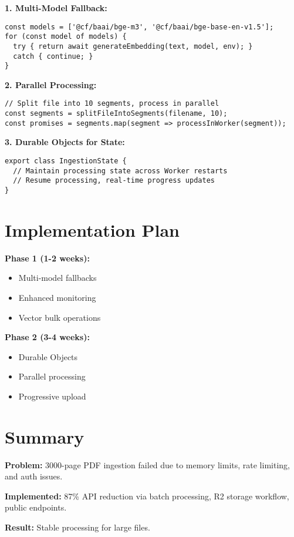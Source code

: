 \documentclass[11pt,a4paper]{article}
\begin{document}
\textbf{1. Multi-Model Fallback:}
\begin{lstlisting}
const models = ['@cf/baai/bge-m3', '@cf/baai/bge-base-en-v1.5'];
for (const model of models) {
  try { return await generateEmbedding(text, model, env); }
  catch { continue; }
}
\end{lstlisting}

\textbf{2. Parallel Processing:}
\begin{lstlisting}
// Split file into 10 segments, process in parallel
const segments = splitFileIntoSegments(filename, 10);
const promises = segments.map(segment => processInWorker(segment));
\end{lstlisting}

\textbf{3. Durable Objects for State:}
\begin{lstlisting}
export class IngestionState {
  // Maintain processing state across Worker restarts
  // Resume processing, real-time progress updates
}
\end{lstlisting}

\section{Implementation Plan}

\textbf{Phase 1 (1-2 weeks):}
\begin{itemize}
    \item Multi-model fallbacks
    \item Enhanced monitoring
    \item Vector bulk operations
\end{itemize}

\textbf{Phase 2 (3-4 weeks):}
\begin{itemize}
    \item Durable Objects
    \item Parallel processing
    \item Progressive upload
\end{itemize}

\section{Summary}

\textbf{Problem:} 3000-page PDF ingestion failed due to memory limits, rate limiting, and auth issues.

\textbf{Implemented:} 87\% API reduction via batch processing, R2 storage workflow, public endpoints.

\textbf{Result:} Stable processing for large files.
\end{document}

